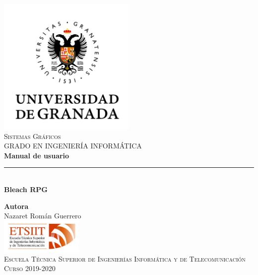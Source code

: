 \documentclass[11pt,a4paper]{article}
\begin{document}
\begin{titlepage}

\begin{minipage}{\textwidth}

\centering
\includegraphics[width=0.5\textwidth]{img/logo.png}\\

\textsc{\Large Sistemas Gráficos\\[0.2cm]}
\textsc{GRADO EN INGENIERÍA INFORMÁTICA}\\[1cm]

{\Huge\bfseries Manual de usuario\\}
\noindent\rule[-1ex]{\textwidth}{3pt}\\[3.5ex]
{\large\bfseries Bleach RPG}
\end{minipage}

\vspace{1.5cm}
\begin{minipage}{\textwidth}
\centering

\textbf{Autora}\\ {Nazaret Román Guerrero}\\[2.5ex]
\includegraphics[width=0.3\textwidth]{img/etsiit.jpeg}\\[0.1cm]
\vspace{1cm}
\textsc{Escuela Técnica Superior de Ingenierías Informática y de Telecomunicación}\\
\vspace{1cm}
\textsc{Curso 2019-2020}
\end{minipage}
\end{titlepage}

\end{document}

